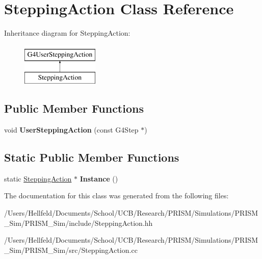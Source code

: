 \hypertarget{class_stepping_action}{}\section{Stepping\+Action Class Reference}
\label{class_stepping_action}
Inheritance diagram for Stepping\+Action\+:\begin{figure}[H]
\begin{center}
\leavevmode
\includegraphics[height=2.000000cm]{class_stepping_action}
\end{center}
\end{figure}
\subsection*{Public Member Functions}
\begin{DoxyCompactItemize}
\item 
\hypertarget{class_stepping_action_a0b072524d0b994cff18f76270ea1ba2a}{}\label{class_stepping_action_a0b072524d0b994cff18f76270ea1ba2a} 
void {\bfseries User\+Stepping\+Action} (const G4\+Step $\ast$)
\end{DoxyCompactItemize}
\subsection*{Static Public Member Functions}
\begin{DoxyCompactItemize}
\item 
\hypertarget{class_stepping_action_af6653db032a4cf153294bfd44b13cdc5}{}\label{class_stepping_action_af6653db032a4cf153294bfd44b13cdc5} 
static \hyperlink{class_stepping_action}{Stepping\+Action} $\ast$ {\bfseries Instance} ()
\end{DoxyCompactItemize}


The documentation for this class was generated from the following files\+:\begin{DoxyCompactItemize}
\item 
/\+Users/\+Hellfeld/\+Documents/\+School/\+U\+C\+B/\+Research/\+P\+R\+I\+S\+M/\+Simulations/\+P\+R\+I\+S\+M\+\_\+\+Sim/\+P\+R\+I\+S\+M\+\_\+\+Sim/include/Stepping\+Action.\+hh\item 
/\+Users/\+Hellfeld/\+Documents/\+School/\+U\+C\+B/\+Research/\+P\+R\+I\+S\+M/\+Simulations/\+P\+R\+I\+S\+M\+\_\+\+Sim/\+P\+R\+I\+S\+M\+\_\+\+Sim/src/Stepping\+Action.\+cc\end{DoxyCompactItemize}

